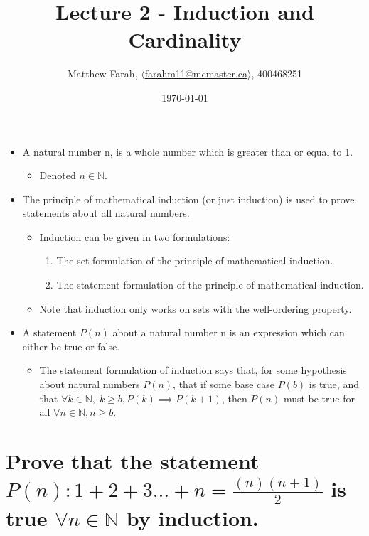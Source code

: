 \documentclass{article}
\title{Lecture 2 - Induction and Cardinality}
\author{Matthew Farah, \href{mailto:farahm11@mcmaster.ca}{$\langle$farahm11@mcmaster.ca$\rangle$}, 400468251}
\date{\today}
\begin{document}
\maketitle
\pagestyle{fancy}

\begin{itemize}
	\item A natural number n, is a whole number which is greater than or equal to 1.
	\begin{itemize}
		\item Denoted $n \in \mathbb{N}$.
	\end{itemize}
	\item The principle of mathematical induction (or just induction) is used to prove statements about all natural numbers.
	\begin{itemize}
		\item Induction can be given in two formulations:
		\begin{enumerate}
			\item The set formulation of the principle of mathematical induction.
			\item The statement formulation of the principle of mathematical induction.
		\end{enumerate}
		\item Note that induction only works on sets with the well-ordering property.
	\end{itemize}
	\item A statement $P(n)$ about a natural number n is an expression which can either be true or false.
	\begin{itemize}
		\item The statement formulation of induction says that, for some hypothesis about natural numbers $P(n)$, that if some base case $P(b)$ is true, and that $\forall k \in \mathbb{N}, \; k \ge b, P(k) \implies P(k + 1)$, then $P(n)$ must be true for all $\forall n \in \mathbb{N}, n \ge b$.
	\end{itemize}
\end{itemize}

\section[Example ~\thesection]{Prove that the statement $P(n): 1 + 2 + 3 \ldots + n = \frac{(n)(n + 1)}{2}$ is true $\forall n \in \mathbb{N}$ by induction.}
\end{document}
